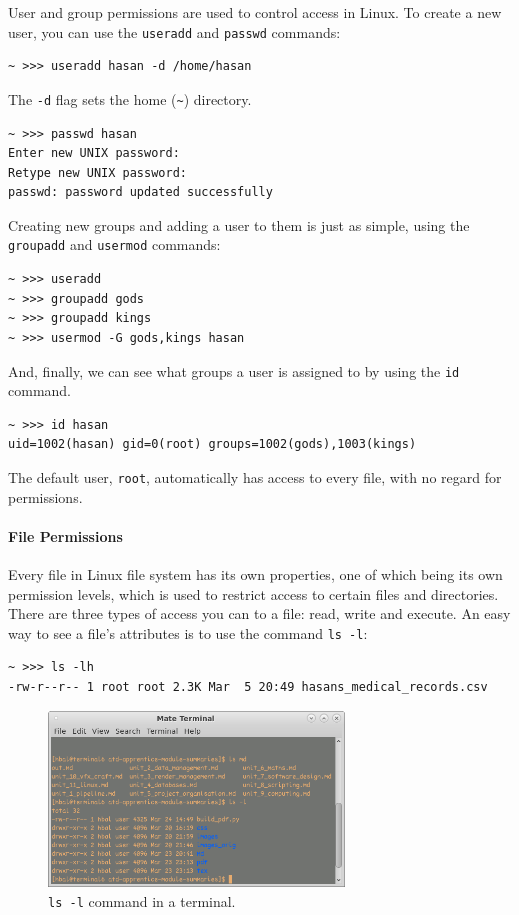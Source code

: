 User and group permissions are used to control access in Linux. To create a new user, you can use the \texttt{useradd} and \texttt{passwd} commands:

\begin{verbatim}
~ >>> useradd hasan -d /home/hasan
\end{verbatim}

The \texttt{-d} flag sets the home (\texttt{\textasciitilde{}}) directory.

\begin{verbatim}
~ >>> passwd hasan
Enter new UNIX password:
Retype new UNIX password:
passwd: password updated successfully
\end{verbatim}

Creating new groups and adding a user to them is just as simple, using the \texttt{groupadd} and \texttt{usermod} commands:

\begin{verbatim}
~ >>> useradd
~ >>> groupadd gods
~ >>> groupadd kings
~ >>> usermod -G gods,kings hasan
\end{verbatim}

And, finally, we can see what groups a user is assigned to by using the \texttt{id} command.

\begin{verbatim}
~ >>> id hasan
uid=1002(hasan) gid=0(root) groups=1002(gods),1003(kings)
\end{verbatim}

The default user, \texttt{root}, automatically has access to every file, with no regard for permissions.

\hypertarget{file-permissions}{%
\paragraph{File Permissions}\label{file-permissions}}

Every file in Linux file system has its own properties, one of which being its own permission levels, which is used to restrict access to certain files and directories. There are three types of access you can to a file: read, write and execute. An easy way to see a file's attributes is to use the command \texttt{ls\ -l}:

\begin{verbatim}
~ >>> ls -lh
-rw-r--r-- 1 root root 2.3K Mar  5 20:49 hasans_medical_records.csv
\end{verbatim}

\begin{figure}
\includegraphics[width=0.7\textwidth,height=\textheight]{./images/terminal_environment.png}
\caption{\texttt{ls\ -l} command in a terminal.}
\end{figure}


